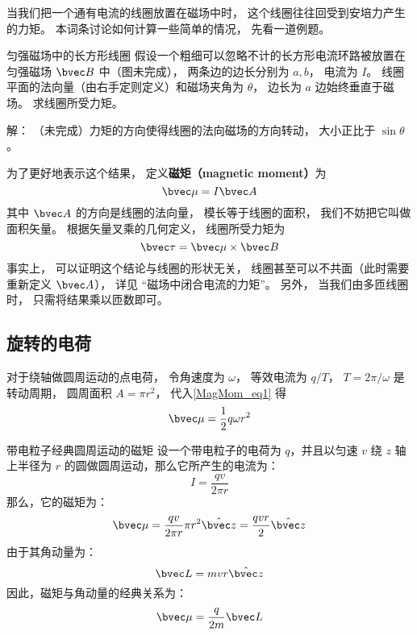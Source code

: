 
\begin{issues}
\issueTODO
\end{issues}


当我们把一个通有电流的线圈放置在磁场中时， 这个线圈往往回受到安培力产生的力矩。 本词条讨论如何计算一些简单的情况， 先看一道例题。

\begin{example}{匀强磁场中的长方形线圈}
假设一个粗细可以忽略不计的长方形电流环路被放置在匀强磁场 $\bvec B$ 中（图未完成）， 两条边的边长分别为 $a, b$， 电流为 $I$。 线圈平面的法向量（由右手定则定义）和磁场夹角为 $\theta$， 边长为 $a$ 边始终垂直于磁场。 求线圈所受力矩。

解： （未完成）力矩的方向使得线圈的法向磁场的方向转动， 大小正比于 $\sin\theta$。
\end{example}

为了更好地表示这个结果， 定义\textbf{磁矩（magnetic moment）}为
\begin{equation}\label{MagMom_eq1}
\bvec \mu = I \bvec A
\end{equation}
其中 $\bvec A$ 的方向是线圈的法向量， 模长等于线圈的面积， 我们不妨把它叫做面积矢量。 根据矢量叉乘的几何定义， 线圈所受力矩为
\begin{equation}
\bvec \tau = \bvec \mu \times \bvec B
\end{equation}
事实上， 可以证明这个结论与线圈的形状无关， 线圈甚至可以不共面（此时需要重新定义 $\bvec A$）， 详见 “磁场中闭合电流的力矩”。 另外， 当我们由多匝线圈时， 只需将结果乘以匝数即可。

\subsection{旋转的电荷}
对于绕轴做圆周运动的点电荷， 令角速度为 $\omega$， 等效电流为 $q/T$， $T = 2\pi/\omega$ 是转动周期， 圆周面积 $A = \pi r^2$， 代入\autoref{MagMom_eq1} 得
\begin{equation}
\bvec \mu = \frac{1}{2} q\omega r^2
\end{equation}

\begin{example}{带电粒子经典圆周运动的磁矩}\label{MagMom_ex1}
设一个带电粒子的电荷为 $q$，并且以匀速 $v$ 绕 $z$ 轴上半径为 $r$ 的圆做圆周运动，那么它所产生的电流为：
\begin{equation}
I=\frac{qv}{2\pi r}
\end{equation}
那么，它的磁矩为：
\begin{equation}
\bvec\mu  = \frac{qv}{2\pi r}\pi r^2 \hat{\bvec z}=\frac{qvr}{2} \hat{\bvec z} 
\end{equation}
由于其角动量为：
\begin{equation}
\bvec L =mvr\hat{\bvec z}
\end{equation}
因此，磁矩与角动量的经典关系为：
\begin{equation}
\bvec\mu  = \frac{q}{2m}\bvec L
\end{equation}

\end{example}
